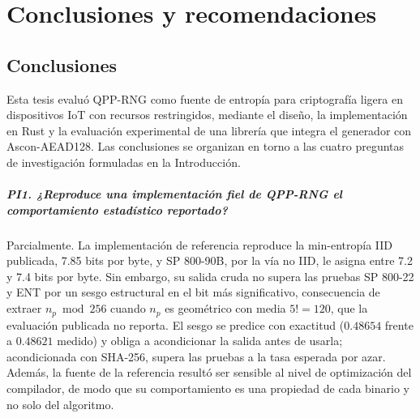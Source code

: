 \chapter{Conclusiones y recomendaciones}
\label{cap:conclusiones}

\section{Conclusiones}

Esta tesis evaluó QPP-RNG como fuente de entropía para criptografía ligera en dispositivos IoT con recursos restringidos, mediante el diseño, la implementación en Rust y la evaluación experimental de una librería que integra el generador con Ascon-AEAD128. Las conclusiones se organizan en torno a las cuatro preguntas de investigación formuladas en la Introducción.

\paragraph{PI1. ¿Reproduce una implementación fiel de QPP-RNG el comportamiento estadístico reportado?} Parcialmente. La implementación de referencia reproduce la min-entropía IID publicada, 7.85 bits por byte, y SP 800-90B, por la vía no IID, le asigna entre 7.2 y 7.4 bits por byte. Sin embargo, su salida cruda no supera las pruebas SP 800-22 y ENT por un sesgo estructural en el bit más significativo, consecuencia de extraer $n_p \bmod 256$ cuando $n_p$ es geométrico con media $5! = 120$, que la evaluación publicada no reporta. El sesgo se predice con exactitud ($0.48654$ frente a $0.48621$ medido) y obliga a acondicionar la salida antes de usarla; acondicionada con SHA-256, supera las pruebas a la tasa esperada por azar. Además, la fuente de la referencia resultó ser sensible al nivel de optimización del compilador, de modo que su comportamiento es una propiedad de cada binario y no solo del algoritmo.

